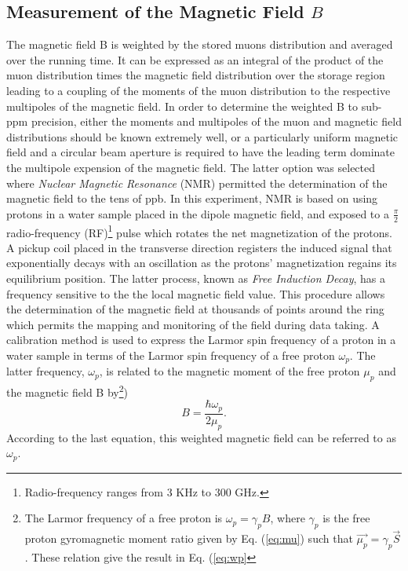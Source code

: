 \documentclass{outhesis}
\begin{document}
\subsection{Measurement of the Magnetic Field $B$}

The magnetic field B is weighted by the stored muons distribution and averaged over the running time. It can be expressed as an integral of the product of the muon distribution times the magnetic field distribution over the storage region leading to a coupling of the moments of the muon distribution to the respective multipoles of the magnetic field. In order to determine the weighted B to sub-ppm precision, either the moments and multipoles of the muon and magnetic field distributions should be known extremely well, or a particularly uniform magnetic field and a circular beam aperture is required to have the leading term dominate the multipole expension of the magnetic field. The latter option was selected where \emph{Nuclear Magnetic Resonance} (NMR) permitted the determination of the magnetic field to the tens of ppb. In this experiment, NMR is based on using protons in a water sample placed in the dipole magnetic field, and exposed to a $\frac{\pi}{2}$ radio-frequency (RF)\footnote{Radio-frequency ranges from 3 KHz to 300 GHz.} pulse which rotates the net magnetization of the protons. A pickup coil placed in the transverse direction registers the induced signal that exponentially decays with an oscillation as the protons' magnetization regains its equilibrium position. The latter process, known as \emph{Free Induction Decay}, has a frequency sensitive to the the local magnetic field value. This procedure allows the determination of the magnetic field at thousands of points around the ring which permits the mapping and monitoring of the field during data taking. A calibration method is used to express the Larmor spin frequency of a proton in a water sample in terms of the Larmor spin frequency of a free proton $\omega_p$. The latter frequency, $\omega_p$, is related to the magnetic moment of the free proton $\mu_p$ and the magnetic field B by\footnote{The Larmor frequency of a free proton is $\omega_p=\gamma_pB$, where $\gamma_p$ is the free proton gyromagnetic moment ratio given by Eq. (\ref{eq:mu}) such that $\overrightarrow{\mu_p} = \gamma_p \overrightarrow{S}$. These relation give the result in Eq. (\ref{eq:wp}})
\begin{equation}
B = \frac{\hbar\omega_p}{2\mu_p}.
\label{eq:wp}
\end{equation} 
According to the last equation, this weighted magnetic field can be referred to as $\omega_p$. 
\end{document}
